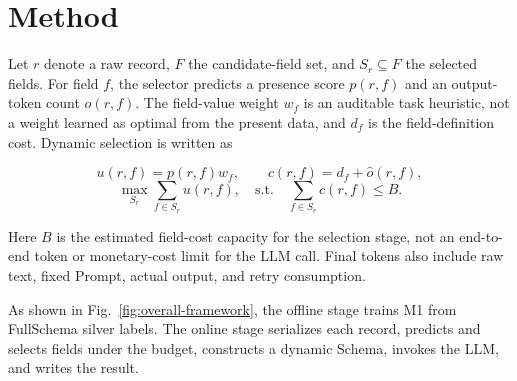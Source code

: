 \documentclass[runningheads]{llncs}
\newcommand{\method}{M1}
\newcommand{\full}{FullSchema}
\begin{document}
\section{Method}

Let $r$ denote a raw record, $F$ the candidate-field set, and $S_r\subseteq F$ the selected fields. For field $f$, the selector predicts a presence score $p(r,f)$ and an output-token count $\hat{o}(r,f)$. The field-value weight $w_f$ is an auditable task heuristic, not a weight learned as optimal from the present data, and $d_f$ is the field-definition cost. Dynamic selection is written as

\begin{equation}
 u(r,f)=p(r,f)w_f,
 \qquad c(r,f)=d_f+\hat{o}(r,f),
 \label{eq:utility-cost}
\end{equation}
\begin{equation}
 \max_{S_r}\sum_{f\in S_r}u(r,f),
  \quad \mathrm{s.t.}\quad \sum_{f\in S_r}c(r,f)\leq B.
\end{equation}

Here $B$ is the estimated field-cost capacity for the selection stage, not an end-to-end token or monetary-cost limit for the LLM call. Final tokens also include raw text, fixed Prompt, actual output, and retry consumption.

As shown in Fig.~\ref{fig:overall-framework}, the offline stage trains \method{} from \full{} silver labels. The online stage serializes each record, predicts and selects fields under the budget, constructs a dynamic Schema, invokes the LLM, and writes the result.
\end{document}
